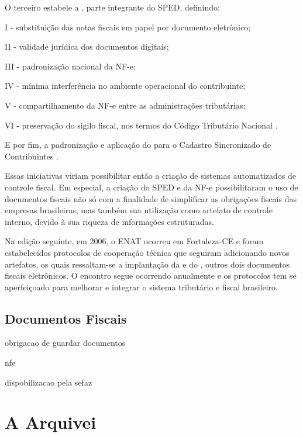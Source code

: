 O terceiro estabele a , parte integrante do SPED, definindo:

\begin{citacao}
I - substituição das notas fiscais em papel por documento eletrônico;

II - validade jurídica dos documentos digitais;

III - padronização nacional da NF-e;

IV - mínima interferência no ambiente operacional do contribuinte;

V - compartilhamento da NF-e entre as administrações tributárias;

VI - preservação do sigilo fiscal, nos termos do Código Tributário Nacional \cite{enat:2005:protocolo3}. 
\end{citacao}

E por fim, a padronização e aplicação do  para o Cadastro Sincronizado de Contribuintes \cite{enat:2005:protocolo4}.

Essas iniciativas viriam possibilitar então a criação de sistemas automatizados de controle fiscal. Em especial, a criação do SPED e da NF-e possibilitaram o uso de documentos fiscais não só com a finalidade de simplificar as obrigações fiscais das empresas brasileiras, mas também sua utilização como artefato de controle interno, devido à sua riqueza de informações estruturadas.

Na edição seguinte, em 2006, o ENAT ocorreu em Fortaleza-CE e foram estabelecidos protocolos de cooperação técnica que seguiram adicionando novos artefatos, os quais ressaltam-se a implantação da  e do , outros dois documentos fiscais eletrônicos. O encontro segue ocorrendo anualmente e os protocolos tem se aperfeiçoado para melhorar e integrar o sistema tributário e fiscal brasileiro.

\subsection{Documentos Fiscais}



obrigacao de guardar documentos

nfe

dispobilizacao pela sefaz

\section{A Arquivei}
\label{section:arquivei}


